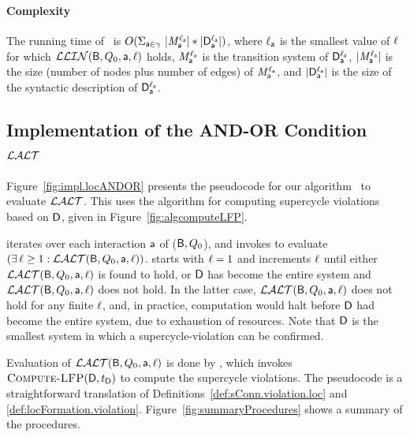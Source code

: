 \paragraph{Complexity} The running  time of \ is
$O(\SUM_{\act \in \gamma}\ |\Mdsk{\act}{\l_\act}| * |\dsks{\act}{\l_\act}|)$,
where 
$\l_\act$ is the smallest value of $\l$ for which $\LLin(\B, Q_0, \act, \l)$ holds, 
$\Mdsk{\act}{\l_\act}$ is the transition system of $\dsks{\act}{\l_\act}$, 
$|\Mdsk{\act}{\l_\act}|$ is the size (number of nodes plus number of edges) of $\Mdsk{\act}{\l_\act}$, and
$|\dsks{\act}{\l_\act}|$ is the size of the syntactic description of $\dsks{\act}{\l_\act}$.




 
   \subsection{Implementation of the AND-OR Condition $\LAO$}
   \label{s:implANDOR}
%   


Figure~\ref{fig:impl.locANDOR} presents the pseudocode for our algorithm \ to evaluate $\LAO$.  This uses the algorithm for
computing supercycle violations based on $\dsk{\act}{\l}$, given in Figure~\ref{fig:algcomputeLFP}.

 iterates over each interaction $\act$ of ($\B, Q_0$), and 
invokes  to evaluate $(\ex \l \ge 1: \LAO(\B, Q_0, \act, \l))$.
starts with $\l=1$ and increments $\l$ until either $\LAO(\B, Q_0, \act, \l)$ is found to hold, or
$\dsk{\act}{\l}$ has become the entire system and $\LAO(\B, Q_0, \act, \l)$ does not hold. In the
latter case, $\LAO(\B, Q_0, \act, \l)$ does not hold for any finite $\l$, and, in practice,
computation would halt before $\dsk{\act}{\l}$ had become the entire system, due to exhaustion of
resources.
Note that $\dsk{\act}{1}$ is the smallest system in which a
supercycle-violation can be confirmed. 

Evaluation of $\LAO(\B, Q_0, \act, \l)$ is done by 
, which invokes
$\cLFP{\dsk{\act}{\l},t_\DS}$ to compute the supercycle violations.
The pseudocode is a straightforward translation of
Definitions~\ref{def:sConn.violation.loc} and \ref{def:locFormation.violation}.
%
Figure~\ref{fig:summaryProcedures} shows a summary of the procedures.

